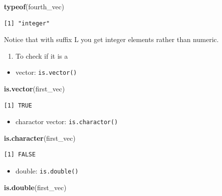 \documentclass[]{book}
\newenvironment{Shaded}{\begin{snugshade}}{\end{snugshade}}
\newcommand{\KeywordTok}[1]{\textcolor[rgb]{0.13,0.29,0.53}{\textbf{#1}}}
\newcommand{\NormalTok}[1]{#1}
\providecommand{\tightlist}{%
  \setlength{\itemsep}{0pt}\setlength{\parskip}{0pt}}
\begin{document}
\begin{Shaded}
\begin{Highlighting}[]
\KeywordTok{typeof}\NormalTok{(fourth_vec)}
\end{Highlighting}
\end{Shaded}

\begin{verbatim}
[1] "integer"
\end{verbatim}

Notice that with suffix L you get integer elements rather than numeric.

\begin{enumerate}
\def\labelenumi{\arabic{enumi}.}
\setcounter{enumi}{1}
\tightlist
\item
  To check if it is a
\end{enumerate}

\begin{itemize}
\tightlist
\item
  vector: \texttt{is.vector()}
\end{itemize}

\begin{Shaded}
\begin{Highlighting}[]
\KeywordTok{is.vector}\NormalTok{(first_vec)}
\end{Highlighting}
\end{Shaded}

\begin{verbatim}
[1] TRUE
\end{verbatim}

\begin{itemize}
\tightlist
\item
  charactor vector: \texttt{is.charactor()}
\end{itemize}

\begin{Shaded}
\begin{Highlighting}[]
\KeywordTok{is.character}\NormalTok{(first_vec)}
\end{Highlighting}
\end{Shaded}

\begin{verbatim}
[1] FALSE
\end{verbatim}

\begin{itemize}
\tightlist
\item
  double: \texttt{is.double()}
\end{itemize}

\begin{Shaded}
\begin{Highlighting}[]
\KeywordTok{is.double}\NormalTok{(first_vec)}
\end{Highlighting}
\end{Shaded}
\end{document}
